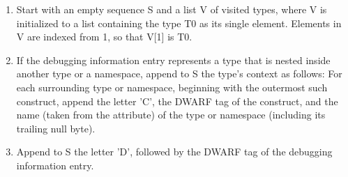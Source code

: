 \begin{enumerate}[1.]

\item Start with an empty sequence S and a list V of visited
types, where V is initialized to a list containing the type
T0 as its single element. Elements in V are indexed from 1,
so that V[1] is T0.

\item If the debugging information entry represents a type that
is nested inside another type or a namespace, append to S
the type’s context as follows: For each surrounding type
or namespace, beginning with the outermost such construct,
append the letter 'C', the DWARF tag of the construct, and
the name (taken from 
the  attribute) of the type
or namespace (including its trailing null byte).

\item  Append to S the letter 'D', followed by the DWARF tag of
the debugging information entry.


\end{enumerate}

